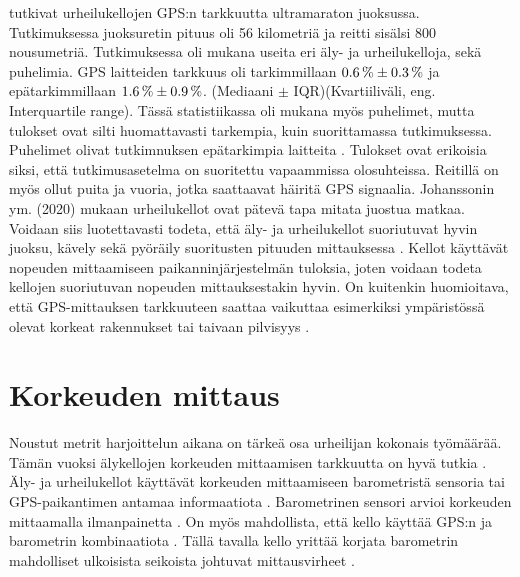 \documentclass[utf8,bachelor,finnish]{bachelor}
\begin{document}
  \textcite{johansson_accuracy_2020} tutkivat urheilukellojen GPS:n tarkkuutta ultramaraton juoksussa. Tutkimuksessa juoksuretin pituus oli 56 kilometriä ja reitti sisälsi 800 nousumetriä.
   Tutkimuksessa oli mukana useita eri äly- ja urheilukelloja, sekä puhelimia.
    GPS laitteiden tarkkuus oli tarkimmillaan $\SI{0.6 \pm 0.3}{\percent}$ ja epätarkimmillaan $ \SI{1.6 \pm 0.9}{\percent} $. (Mediaani $\pm$ IQR)(Kvartiiliväli, eng. Interquartile range).
     Tässä statistiikassa oli mukana myös puhelimet, mutta 
     tulokset ovat silti huomattavasti tarkempia, kuin \textcite{gilgen-ammann_accuracy_2020} suorittamassa tutkimuksessa. Puhelimet olivat tutkimnuksen epätarkimpia laitteita \parencite{johansson_accuracy_2020}.
      Tulokset ovat erikoisia siksi, että \textcite{johansson_accuracy_2020} tutkimusasetelma on suoritettu vapaammissa olosuhteissa. Reitillä on myös ollut puita ja vuoria, jotka saattaavat häiritä GPS signaalia.
     Johanssonin ym. (2020) mukaan urheilukellot ovat pätevä tapa mitata juostua matkaa.\\

  Voidaan siis luotettavasti todeta, että äly- ja urheilukellot suoriutuvat hyvin juoksu, kävely sekä pyöräily suoritusten pituuden mittauksessa \parencite{gilgen-ammann_accuracy_2020,johansson_accuracy_2020}.
    Kellot käyttävät nopeuden mittaamiseen paikanninjärjestelmän tuloksia, joten voidaan todeta kellojen suoriutuvan nopeuden mittauksestakin hyvin. On kuitenkin huomioitava,
    että GPS-mittauksen tarkkuuteen saattaa vaikuttaa esimerkiksi ympäristössä olevat korkeat rakennukset tai taivaan pilvisyys \parencite{baranski_enhancing_2012}.

  \section{Korkeuden mittaus}
    Noustut metrit harjoittelun aikana on tärkeä osa urheilijan kokonais työmäärää. Tämän vuoksi älykellojen korkeuden mittaamisen tarkkuutta on hyvä tutkia \parencite{ammann_accuracy_2016}.
     Äly- ja urheilukellot käyttävät korkeuden mittaamiseen barometristä sensoria tai GPS-paikantimen antamaa informaatiota \parencite{ammann_accuracy_2016}.
      Barometrinen sensori arvioi korkeuden mittaamalla ilmanpainetta \parencite{aroganam2019review}.
       On myös mahdollista, että kello käyttää GPS:n ja barometrin kombinaatiota \parencite{aroganam2019review}. Tällä tavalla kello yrittää korjata barometrin mahdolliset ulkoisista seikoista
        johtuvat mittausvirheet \parencite{aroganam2019review}.\\
        
\end{document}
